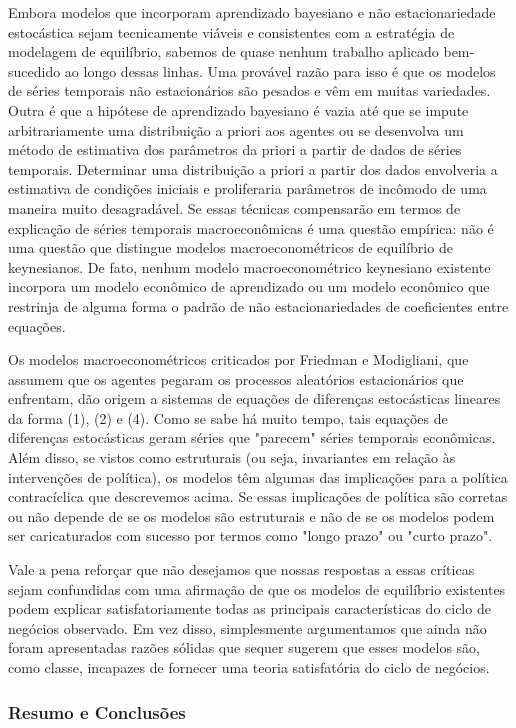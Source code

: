 \documentclass[12pt]{article}
\begin{document}
Embora modelos que incorporam aprendizado bayesiano e não estacionariedade estocástica sejam tecnicamente viáveis e consistentes com a estratégia de modelagem de equilíbrio, sabemos de quase nenhum trabalho aplicado bem-sucedido ao longo dessas linhas. Uma provável razão para isso é que os modelos de séries temporais não estacionários são pesados e vêm em muitas variedades. Outra é que a hipótese de aprendizado bayesiano é vazia até que se impute arbitrariamente uma distribuição a priori aos agentes ou se desenvolva um método de estimativa dos parâmetros da priori a partir de dados de séries temporais. Determinar uma distribuição a priori a partir dos dados envolveria a estimativa de condições iniciais e proliferaria parâmetros de incômodo de uma maneira muito desagradável. Se essas técnicas compensarão em termos de explicação de séries temporais macroeconômicas é uma questão empírica: não é uma questão que distingue modelos macroeconométricos de equilíbrio de keynesianos. De fato, nenhum modelo macroeconométrico keynesiano existente incorpora um modelo econômico de aprendizado ou um modelo econômico que restrinja de alguma forma o padrão de não estacionariedades de coeficientes entre equações.

Os modelos macroeconométricos criticados por Friedman e Modigliani, que assumem que os agentes pegaram os processos aleatórios estacionários que enfrentam, dão origem a sistemas de equações de diferenças estocásticas lineares da forma (1), (2) e (4). Como se sabe há muito tempo, tais equações de diferenças estocásticas geram séries que "parecem" séries temporais econômicas. Além disso, se vistos como estruturais (ou seja, invariantes em relação às intervenções de política), os modelos têm algumas das implicações para a política contracíclica que descrevemos acima. Se essas implicações de política são corretas ou não depende de se os modelos são estruturais e não de se os modelos podem ser caricaturados com sucesso por termos como "longo prazo" ou "curto prazo".

Vale a pena reforçar que não desejamos que nossas respostas a essas críticas sejam confundidas com uma afirmação de que os modelos de equilíbrio existentes podem explicar satisfatoriamente todas as principais características do ciclo de negócios observado. Em vez disso, simplesmente argumentamos que ainda não foram apresentadas razões sólidas que sequer sugerem que esses modelos são, como classe, incapazes de fornecer uma teoria satisfatória do ciclo de negócios.

\subsubsection{\textbf{Resumo e Conclusões}}
\end{document}
